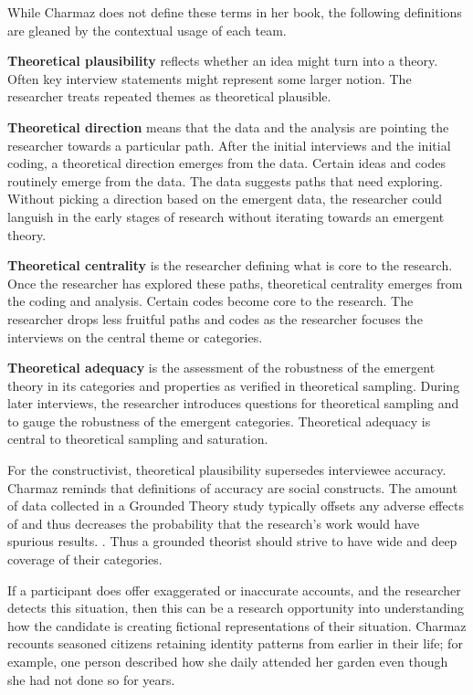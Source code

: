 While Charmaz does not define these terms in her book, the following definitions are gleaned by the contextual usage of each team.

\textbf{Theoretical plausibility} reflects whether an idea might turn into a theory. Often key interview statements might represent some larger notion. The researcher treats repeated themes as theoretical plausible.

\textbf{Theoretical direction} means that the data and the analysis are pointing the researcher towards a particular path. After the initial interviews and the initial coding, a theoretical direction emerges from the data. Certain ideas and codes routinely emerge from the data. The data suggests paths that need exploring. Without picking a direction based on the emergent data, the researcher could languish in the early stages of research without iterating towards an emergent theory. 

\textbf{Theoretical centrality} is the researcher defining what is core to the research. Once the researcher has explored these paths, theoretical centrality emerges from the coding and analysis. Certain codes become core to the research. The researcher drops less fruitful paths and codes as the researcher focuses the interviews on the central theme or categories. 

\textbf{Theoretical adequacy} is the assessment of the robustness of the emergent theory in its categories and properties as verified in theoretical sampling. During later interviews, the researcher introduces questions for theoretical sampling and to gauge the robustness of the emergent categories. Theoretical adequacy is central to theoretical sampling and saturation. 

For the constructivist, theoretical plausibility supersedes interviewee accuracy. Charmaz reminds that definitions of accuracy are social constructs. The amount of data collected in a Grounded Theory study typically offsets any adverse effects of  and thus decreases the probability that the research's work would have spurious results.  \cite{Charmaz}. Thus a grounded theorist should strive to have wide and deep coverage of their categories. 

If a participant does offer exaggerated or inaccurate accounts, and the researcher detects this situation, then this can be a research opportunity into understanding how the candidate is creating fictional representations of their situation. Charmaz recounts seasoned citizens retaining identity patterns from earlier in their life; for example, one person described how she daily attended her garden even though she had not done so for years.


